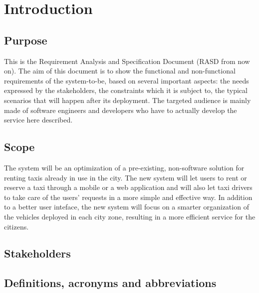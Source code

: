 \section{Introduction}

\subsection{Purpose}
This is the Requirement Analysis and Specification Document (RASD from now on). The aim of this document is to show the functional and non-functional requirements of the system-to-be, based on several important aspects: the needs expressed by the stakeholders, the constraints which it is subject to, the typical scenarios that will happen after its deployment. The targeted audience is mainly made of software engineers and developers who have to actually develop the service here described.

\subsection{Scope}
The system will be an optimization of a pre-existing, non-software solution for renting taxis already in use in the city. The new system will let users to rent or reserve a taxi through a mobile or a web application and will also let taxi drivers to take care of the users' requests in a more simple and effective way. In addition to a better user inteface, the new system will focus on a smarter organization of the vehicles deployed in each city zone, resulting in a more efficient service for the citizens.

\subsection{Stakeholders}

\subsection{Definitions, acronyms and abbreviations}
